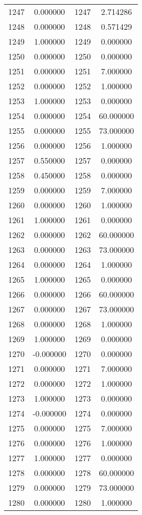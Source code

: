 \documentclass[12pt]{article}
\begin{document}
\begin{longtable}{@{}cccc@{}}
1247 & 0.000000 & 1247 & 2.714286 \\
1248 & 0.000000 & 1248 & 0.571429 \\
1249 & 1.000000 & 1249 & 0.000000 \\
1250 & 0.000000 & 1250 & 0.000000 \\
1251 & 0.000000 & 1251 & 7.000000 \\
1252 & 0.000000 & 1252 & 1.000000 \\
1253 & 1.000000 & 1253 & 0.000000 \\
1254 & 0.000000 & 1254 & 60.000000 \\
1255 & 0.000000 & 1255 & 73.000000 \\
1256 & 0.000000 & 1256 & 1.000000 \\
1257 & 0.550000 & 1257 & 0.000000 \\
1258 & 0.450000 & 1258 & 0.000000 \\
1259 & 0.000000 & 1259 & 7.000000 \\
1260 & 0.000000 & 1260 & 1.000000 \\
1261 & 1.000000 & 1261 & 0.000000 \\
1262 & 0.000000 & 1262 & 60.000000 \\
1263 & 0.000000 & 1263 & 73.000000 \\
1264 & 0.000000 & 1264 & 1.000000 \\
1265 & 1.000000 & 1265 & 0.000000 \\
1266 & 0.000000 & 1266 & 60.000000 \\
1267 & 0.000000 & 1267 & 73.000000 \\
1268 & 0.000000 & 1268 & 1.000000 \\
1269 & 1.000000 & 1269 & 0.000000 \\
1270 & -0.000000 & 1270 & 0.000000 \\
1271 & 0.000000 & 1271 & 7.000000 \\
1272 & 0.000000 & 1272 & 1.000000 \\
1273 & 1.000000 & 1273 & 0.000000 \\
1274 & -0.000000 & 1274 & 0.000000 \\
1275 & 0.000000 & 1275 & 7.000000 \\
1276 & 0.000000 & 1276 & 1.000000 \\
1277 & 1.000000 & 1277 & 0.000000 \\
1278 & 0.000000 & 1278 & 60.000000 \\
1279 & 0.000000 & 1279 & 73.000000 \\
1280 & 0.000000 & 1280 & 1.000000 \\

\end{longtable}
\end{document}
